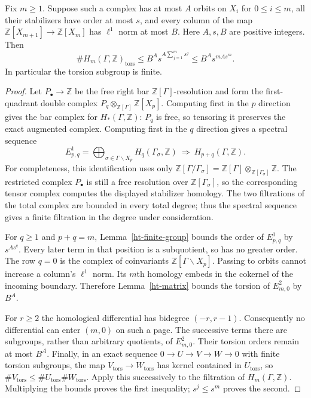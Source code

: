 \begin{proposition}\label{ht-permutation}
Fix $m\ge1$.  Suppose such a complex has at most $A$ orbits on
$X_i$ for $0\le i\le m$, all their stabilizers have order at most
$s$, and every column of the map
$\mathbb Z[X_{m+1}]\to\mathbb Z[X_m]$ has $\ell^1$ norm at most
$B$.  Here $A,s,B$ are positive integers.  Then
\begin{equation}\label{ht-torsion-bound}
 \#H_m(\Gamma,\mathbb Z)_{\mathrm{tors}}
 \le B^A s^{A\sum_{j=1}^m s^j}
 \le B^A s^{mAs^m}.
\end{equation}
In particular the torsion subgroup is finite.
\end{proposition}
\begin{proof}
Let $P_\bullet\to\mathbb Z$ be the free right bar
$\mathbb Z[\Gamma]$-resolution and form the first-quadrant double
complex $P_q\otimes_{\mathbb Z[\Gamma]}\mathbb Z[X_p]$.
Computing first in the $p$ direction gives the bar complex for
$H_*(\Gamma,\mathbb Z)$: $P_q$ is free, so tensoring it preserves
the exact augmented complex.  Computing first in the $q$ direction
gives a spectral sequence
\[
 E^1_{p,q}
 =\bigoplus_{\sigma\in\Gamma\backslash X_p}
           H_q(\Gamma_\sigma,\mathbb Z)
 \ \Longrightarrow\ H_{p+q}(\Gamma,\mathbb Z).
\]
For completeness, this identification uses only
$\mathbb Z[\Gamma/\Gamma_\sigma]
=\mathbb Z[\Gamma]\otimes_{\mathbb Z[\Gamma_\sigma]}\mathbb Z$.
The restricted complex $P_\bullet$ is still a free resolution
over $\mathbb Z[\Gamma_\sigma]$, so the corresponding tensor
complex computes the displayed stabilizer homology.  The two
filtrations of the total complex are bounded in every total
degree; thus the spectral sequence gives a finite filtration
in the degree under consideration.

For $q\ge1$ and $p+q=m$, Lemma~\ref{ht-finite-group} bounds the
order of $E^1_{p,q}$ by $s^{As^q}$.  Every later term in that
position is a subquotient, so has no greater order.
The row $q=0$ is the complex of coinvariants
$\mathbb Z[\Gamma\backslash X_p]$.  Passing to orbits cannot
increase a column's $\ell^1$ norm.  Its $m$th homology embeds
in the cokernel of the incoming boundary.  Therefore
Lemma~\ref{ht-matrix} bounds the torsion of $E^2_{m,0}$
by $B^A$.

For $r\ge2$ the homological differential has bidegree
$(-r,r-1)$.  Consequently no differential can enter
$(m,0)$ on such a page.  The successive terms there are
subgroups, rather than arbitrary quotients, of $E^2_{m,0}$.
Their torsion orders remain at most $B^A$.
Finally, in an exact sequence $0\to U\to V\to W\to0$
with finite torsion subgroups, the map
$V_{\mathrm{tors}}\to W_{\mathrm{tors}}$ has kernel contained
in $U_{\mathrm{tors}}$, so
$\#V_{\mathrm{tors}}\le\#U_{\mathrm{tors}}\#W_{\mathrm{tors}}$.
Apply this successively to the filtration of
$H_m(\Gamma,\mathbb Z)$.  Multiplying the bounds proves the
first inequality; $s^j\le s^m$ proves the second.
\end{proof}

